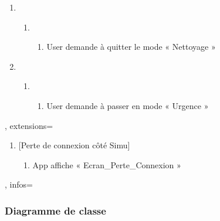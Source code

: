 {{\begin{minipage} {0.5\textwidth}
\begin{enumerate}[label=\arabic*.,ref=\arabic*]
\begin{enumerate}[label=\theenumi.\alph*.,ref=\theenumi\alph*]
\begin{enumerate}[label=\theenumii.\arabic*.,ref=\theenumii\alph*]
                                \end{enumerate}
                      \end{enumerate}
                \item \
                      \begin{enumerate}[label=\theenumi.\alph*.,ref=\theenumi\alph*]
                          \item \
                                \begin{enumerate}[label=\theenumii.\arabic*.,ref=\theenumii\alph*]
                                    \item User demande à quitter le mode « Nettoyage »
                                \end{enumerate}
                      \end{enumerate}
                \item \
                      \begin{enumerate}[label=\theenumi.\alph*.,ref=\theenumi\alph*]
                          \item \
                                \begin{enumerate}[label=\theenumii.\arabic*.,ref=\theenumii\alph*]
                                    \item User demande à passer en mode « Urgence »
                                \end{enumerate}
                      \end{enumerate}

            \end{enumerate}
        \end{minipage}
    },
extensions={
    \begin{minipage}{0.5\textwidth}
        \begin{enumerate} [label=*.,ref=*]
            \item  {[Perte de connexion côté Simu]}
            \begin{enumerate} [label=\theenumi.\arabic*.,ref=\theenumi\alph*]
                \item App affiche « Ecran\_Perte\_Connexion »
                \end{enumerate}
        \end{enumerate}
        
    \end{minipage}
},
infos={}
}

\subsubsection{Diagramme de classe}


